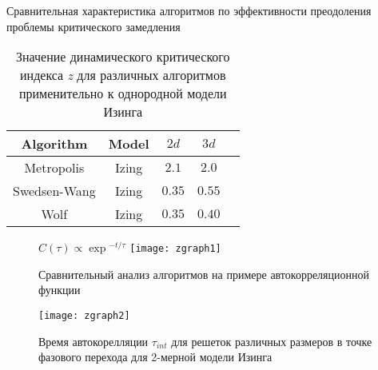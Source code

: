 \documentclass{beamer}
\begin{document}
\begin{frame}{Сравнительная характеристика алгоритмов по эффективности
преодоления проблемы критического замедления} 
\begin{table}\caption{Значение
динамического критического индекса \textit{z} для различных алгоритмов
применительно к однородной модели Изинга\footnotemark[2] }
\begin{center}
\begin{tabular}{|c|c|c|c|c}
\hline
   Algorithm & Model & $2d $ & $3d$ \\
   \hline
	Metropolis & Izing & $2.1$ & $2.0$ \\
	Swedsen-Wang & Izing & $0.35$ & $0.55$ \\ 
	Wolf & Izing & $ 0.35$ & $0.40$ \\
\hline
\end{tabular}
\end{center}
\end{table}
\end{frame}

\begin{frame}{}
\begin{figure}[t]
$C\left(\tau\right) \propto \exp{^{-t/\tau}}$
    \texttt{[image: zgraph1]}
    \caption{Сравнительный анализ алгоритмов на примере автокорреляционной
    функции\footnotemark[3]}
	\label{fig:2}
\end{figure}

\end{frame}

\begin{frame}
\begin{figure}[h]
    \texttt{[image: zgraph2]}
    \caption{Время автокорелляции $\tau_{int}$
    для решеток различных размеров в точке фазового перехода для 2-мерной
    модели Изинга\footnotemark[3]}
	\label{fig:1}
\end{figure}
\end{frame}
\end{document}
